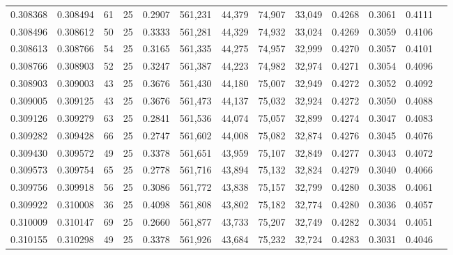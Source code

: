 \begin{tabular}{rrrrrrrrrrrrr}
0.308368 & 0.308494 &    61 &  25 &                                     0.2907 & 561,231 &  44,379 &  74,907 &  33,049 & 0.4268 & 0.3061 & 0.4111 \\
0.308496 & 0.308612 &    50 &  25 &                                     0.3333 & 561,281 &  44,329 &  74,932 &  33,024 & 0.4269 & 0.3059 & 0.4106 \\
0.308613 & 0.308766 &    54 &  25 &                                     0.3165 & 561,335 &  44,275 &  74,957 &  32,999 & 0.4270 & 0.3057 & 0.4101 \\
0.308766 & 0.308903 &    52 &  25 &                                     0.3247 & 561,387 &  44,223 &  74,982 &  32,974 & 0.4271 & 0.3054 & 0.4096 \\
0.308903 & 0.309003 &    43 &  25 &                                     0.3676 & 561,430 &  44,180 &  75,007 &  32,949 & 0.4272 & 0.3052 & 0.4092 \\
0.309005 & 0.309125 &    43 &  25 &                                     0.3676 & 561,473 &  44,137 &  75,032 &  32,924 & 0.4272 & 0.3050 & 0.4088 \\
0.309126 & 0.309279 &    63 &  25 &                                     0.2841 & 561,536 &  44,074 &  75,057 &  32,899 & 0.4274 & 0.3047 & 0.4083 \\
0.309282 & 0.309428 &    66 &  25 &                                     0.2747 & 561,602 &  44,008 &  75,082 &  32,874 & 0.4276 & 0.3045 & 0.4076 \\
0.309430 & 0.309572 &    49 &  25 &                                     0.3378 & 561,651 &  43,959 &  75,107 &  32,849 & 0.4277 & 0.3043 & 0.4072 \\
0.309573 & 0.309754 &    65 &  25 &                                     0.2778 & 561,716 &  43,894 &  75,132 &  32,824 & 0.4279 & 0.3040 & 0.4066 \\
0.309756 & 0.309918 &    56 &  25 &                                     0.3086 & 561,772 &  43,838 &  75,157 &  32,799 & 0.4280 & 0.3038 & 0.4061 \\
0.309922 & 0.310008 &    36 &  25 &                                     0.4098 & 561,808 &  43,802 &  75,182 &  32,774 & 0.4280 & 0.3036 & 0.4057 \\
0.310009 & 0.310147 &    69 &  25 &                                     0.2660 & 561,877 &  43,733 &  75,207 &  32,749 & 0.4282 & 0.3034 & 0.4051 \\
0.310155 & 0.310298 &    49 &  25 &                                     0.3378 & 561,926 &  43,684 &  75,232 &  32,724 & 0.4283 & 0.3031 & 0.4046 \\

\end{tabular}
